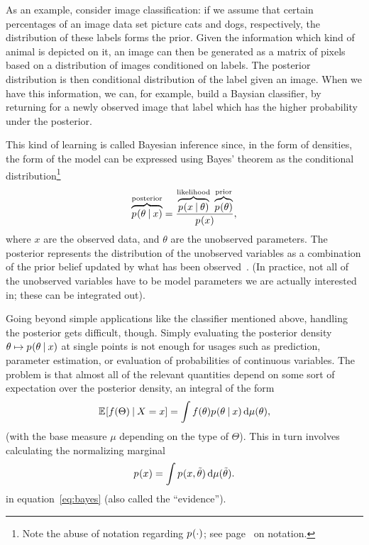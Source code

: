 As an example, consider image classification: if we assume that certain percentages of an image data
set picture cats and dogs, respectively, the distribution of these labels forms the prior.  Given
the information which kind of animal is depicted on it, an image can then be generated as a matrix
of pixels based on a distribution of images conditioned on labels.  The posterior distribution is
then conditional distribution of the label given an image.  When we have this information, we
can, for example, build a Baysian classifier, by returning for a newly observed image that label
which has the higher probability under the posterior.

This kind of learning is called Bayesian inference since, in the form of densities, the form of the
model can be expressed using Bayes' theorem as the conditional distribution\footnote{Note the abuse
  of notation regarding \(\prob{\cdot}\); see page~\pageref{cha:notation} on notation.}
\begin{equation}
  \label{eq:bayes}
  \overbrace{\prob{\theta \given x}}^{\text{posterior}} =
  \frac{\overbrace{\prob{x \given \theta}}^{\text{likelihood}}\;
    \overbrace{\prob{\theta}}^{\text{prior}}}{\prob{x}},
\end{equation}
where \(x\) are the observed data, and \(\theta\) are the unobserved parameters. The posterior
represents the distribution of the unobserved variables as a combination of the prior belief updated
by what has been observed~\cite{congdon2006bayesian}.  (In practice, not all of the unobserved
variables have to be model parameters we are actually interested in; these can be integrated out).

Going beyond simple applications like the classifier mentioned above, handling the posterior gets
difficult, though.  Simply evaluating the posterior density
\(\theta \mapsto \prob{\theta \given x}\) at single points is not enough for usages such as
prediction, parameter estimation, or evaluation of probabilities of continuous variables.  The
problem is that almost all of the relevant quantities depend on some sort of expectation over the
posterior density, an integral of the form
\begin{equation}
  \label{eq:posterior-expectation}
  \Exp{f(\Theta) \given X = x} = \int f(\theta) \prob{\theta \given x} \dif \mu(\theta),
\end{equation}
(with the base measure \(\mu\) depending on the type of \(\Theta\)). This in turn involves
calculating the normalizing marginal
\begin{equation}
  \label{eq:normalizing}
  \prob{x} = \int \prob{x, \tilde{\theta}} \dif \mu(\tilde{\theta}).
\end{equation}
in equation~\ref{eq:bayes} (also called the \enquote{evidence}).

